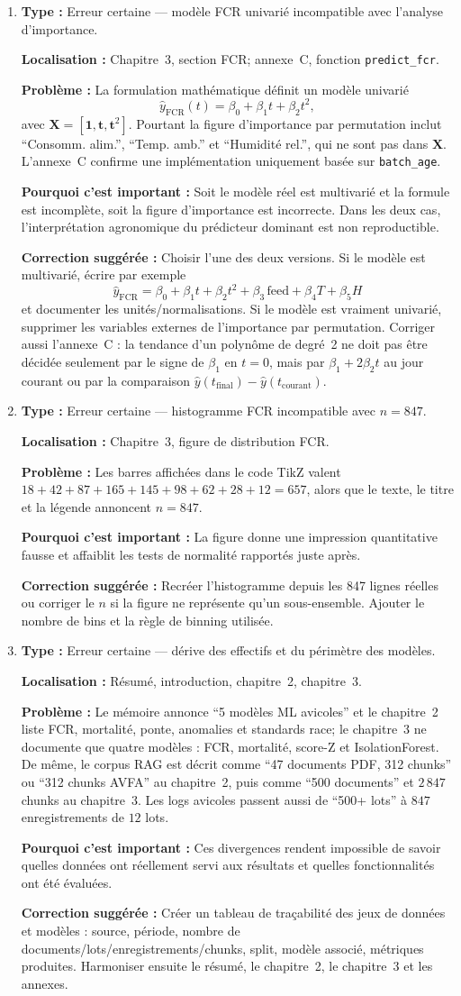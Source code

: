 \documentclass[11pt,a4paper]{article}
\newcommand{\loc}[1]{\textbf{Localisation :} #1\par}
\newcommand{\prob}[1]{\textbf{Problème :} #1\par}
\newcommand{\impact}[1]{\textbf{Pourquoi c'est important :} #1\par}
\newcommand{\fix}[1]{\textbf{Correction suggérée :} #1\par}
\newcommand{\classif}[1]{\textbf{Type :} #1\par}
\begin{document}
\begin{enumerate}
  \item \classif{Erreur certaine --- modèle FCR univarié incompatible avec l'analyse d'importance.}
  \loc{Chapitre~3, section FCR; annexe~C, fonction \texttt{predict\_fcr}.}
  \prob{La formulation mathématique définit un modèle univarié
  \[
    \hat{y}_\text{FCR}(t)=\beta_0+\beta_1t+\beta_2t^2,
  \]
  avec \(\mathbf{X}=[\mathbf{1},\mathbf{t},\mathbf{t}^2]\). Pourtant la figure d'importance par permutation inclut \enquote{Consomm. alim.}, \enquote{Temp. amb.} et \enquote{Humidité rel.}, qui ne sont pas dans \(\mathbf{X}\). L'annexe~C confirme une implémentation uniquement basée sur \texttt{batch\_age}.}
  \impact{Soit le modèle réel est multivarié et la formule est incomplète, soit la figure d'importance est incorrecte. Dans les deux cas, l'interprétation agronomique du prédicteur dominant est non reproductible.}
  \fix{Choisir l'une des deux versions. Si le modèle est multivarié, écrire par exemple
  \[
    \hat{y}_\text{FCR}=\beta_0+\beta_1t+\beta_2t^2+\beta_3\,\text{feed}+\beta_4T+\beta_5H
  \]
  et documenter les unités/normalisations. Si le modèle est vraiment univarié, supprimer les variables externes de l'importance par permutation. Corriger aussi l'annexe~C : la tendance d'un polynôme de degré~2 ne doit pas être décidée seulement par le signe de \(\beta_1\) en \(t=0\), mais par \(\beta_1+2\beta_2t\) au jour courant ou par la comparaison \(\hat{y}(t_\mathrm{final})-\hat{y}(t_\mathrm{courant})\).}

  \item \classif{Erreur certaine --- histogramme FCR incompatible avec \(n=847\).}
  \loc{Chapitre~3, figure de distribution FCR.}
  \prob{Les barres affichées dans le code TikZ valent \(18+42+87+165+145+98+62+28+12=657\), alors que le texte, le titre et la légende annoncent \(n=847\).}
  \impact{La figure donne une impression quantitative fausse et affaiblit les tests de normalité rapportés juste après.}
  \fix{Recréer l'histogramme depuis les 847 lignes réelles ou corriger le \(n\) si la figure ne représente qu'un sous-ensemble. Ajouter le nombre de bins et la règle de binning utilisée.}

  \item \classif{Erreur certaine --- dérive des effectifs et du périmètre des modèles.}
  \loc{Résumé, introduction, chapitre~2, chapitre~3.}
  \prob{Le mémoire annonce \enquote{5 modèles ML avicoles} et le chapitre~2 liste FCR, mortalité, ponte, anomalies et standards race; le chapitre~3 ne documente que quatre modèles : FCR, mortalité, score-Z et IsolationForest. De même, le corpus RAG est décrit comme \enquote{47 documents PDF, 312 chunks} ou \enquote{312 chunks AVFA} au chapitre~2, puis comme \enquote{500 documents} et \(2\,847\) chunks au chapitre~3. Les logs avicoles passent aussi de \enquote{500+ lots} à \(847\) enregistrements de \(12\) lots.}
  \impact{Ces divergences rendent impossible de savoir quelles données ont réellement servi aux résultats et quelles fonctionnalités ont été évaluées.}
  \fix{Créer un tableau de traçabilité des jeux de données et modèles : source, période, nombre de documents/lots/enregistrements/chunks, split, modèle associé, métriques produites. Harmoniser ensuite le résumé, le chapitre~2, le chapitre~3 et les annexes.}


\end{enumerate}
\end{document}
